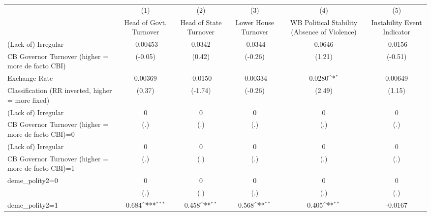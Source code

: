 {
\def\sym#1{\ifmmode^{#1}\else\(^{#1}\)\fi}
\begin{tabular}{l*{5}{c}}
\hline\hline
                    &\multicolumn{1}{c}{(1)}&\multicolumn{1}{c}{(2)}&\multicolumn{1}{c}{(3)}&\multicolumn{1}{c}{(4)}&\multicolumn{1}{c}{(5)}\\
                    &\multicolumn{1}{c}{Head of Govt. Turnover}&\multicolumn{1}{c}{Head of State Turnover}&\multicolumn{1}{c}{Lower House Turnover}&\multicolumn{1}{c}{WB Political Stability (Absence of Violence)}&\multicolumn{1}{c}{Instability Event Indicator}\\
\hline
(Lack of) Irregular &    -0.00453         &      0.0342         &     -0.0344         &      0.0646         &     -0.0156         \\
CB Governor Turnover (higher = more de facto CBI)&     (-0.05)         &      (0.42)         &     (-0.26)         &      (1.21)         &     (-0.51)         \\
[1em]
Exchange Rate       &     0.00369         &     -0.0150         &    -0.00334         &      0.0280\sym{*}  &     0.00649         \\
Classification (RR inverted, higher = more fixed)&      (0.37)         &     (-1.74)         &     (-0.26)         &      (2.49)         &      (1.15)         \\
[1em]
(Lack of) Irregular &           0         &           0         &           0         &           0         &           0         \\
CB Governor Turnover (higher = more de facto CBI)=0&         (.)         &         (.)         &         (.)         &         (.)         &         (.)         \\
[1em]
(Lack of) Irregular &           0         &           0         &           0         &           0         &           0         \\
CB Governor Turnover (higher = more de facto CBI)=1&         (.)         &         (.)         &         (.)         &         (.)         &         (.)         \\
[1em]
deme\_polity2=0      &           0         &           0         &           0         &           0         &           0         \\
                    &         (.)         &         (.)         &         (.)         &         (.)         &         (.)         \\
[1em]
deme\_polity2=1      &       0.684\sym{***}&       0.458\sym{**} &       0.568\sym{**} &       0.405\sym{**} &     -0.0167         \\

\end{tabular}}
